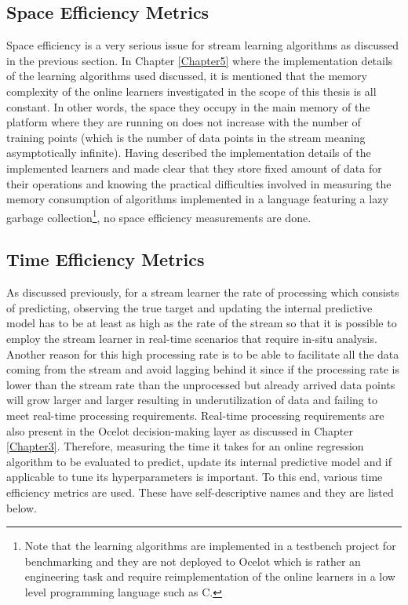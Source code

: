 \subsection{Space Efficiency Metrics}

Space efficiency is a very serious issue for stream learning algorithms as discussed in the previous section. In Chapter \ref{Chapter5} where the implementation details of the learning algorithms used discussed, it is mentioned that the memory complexity of the online learners investigated in the scope of this thesis is all constant. In other words, the space they occupy in the main memory of the platform where they are running on does not increase with the number of training points (which is the number of data points in the stream meaning asymptotically infinite). Having described the implementation details of the implemented learners and made clear that they store fixed amount of data for their operations and knowing the practical difficulties involved in measuring the memory consumption of algorithms implemented in a language featuring a lazy garbage collection\footnote{Note that the learning algorithms are implemented in a testbench project for benchmarking and they are not deployed to Ocelot which is rather an engineering task and require reimplementation of the online learners in a low level programming language such as C.}, no space efficiency measurements are done. 

\subsection{Time Efficiency Metrics}

As discussed previously, for a stream learner the rate of processing which consists of predicting, observing the true target and updating the internal predictive model has to be  at least as high as the rate of the stream so that it is possible to employ the stream learner in real-time scenarios that require in-situ analysis. Another reason for this high processing rate is to be able to facilitate all the data coming from the stream and avoid lagging behind it since if the processing rate is lower than the stream rate than the unprocessed but already arrived data points will grow larger and larger resulting in underutilization of data and failing to meet real-time processing requirements. Real-time processing requirements are also present in the Ocelot decision-making layer as discussed in Chapter \ref{Chapter3}. Therefore, measuring the time it takes for an online regression algorithm to be evaluated to predict, update its internal predictive model and if applicable to tune its hyperparameters is important. To this end, various time efficiency metrics are used. These have self-descriptive names and they are listed below.

